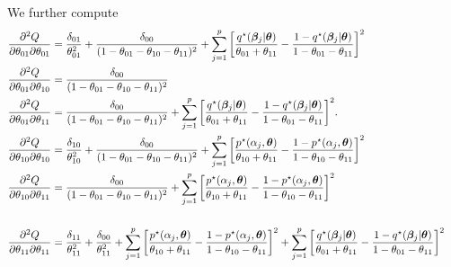 We further compute
\begin{align*}
\frac{\partial^{2} Q}{\partial \theta_{01} \partial \theta_{01}} &= \frac{\delta_{01}}{\theta_{01}^{2}} + \frac{\delta_{00}}{(1 - \theta_{01} - \theta_{10} - \theta_{11})^{2}} + \sum_{j = 1}^{p}{\left[\frac{q^{\star}(\boldsymbol{\beta}_{j}\vert\boldsymbol{\theta})}{\theta_{01} + \theta_{11}} - \frac{1 - q^{\star}(\boldsymbol{\beta}_{j}\vert \boldsymbol{\theta})}{1 - \theta_{01} - \theta_{11}}\right]^{2}} \\
\frac{\partial^{2} Q}{\partial \theta_{01}\partial \theta_{10}} &= \frac{\delta_{00}}{(1 - \theta_{01} - \theta_{10} - \theta_{11})^{2}} \\
\frac{\partial^{2} Q}{\partial \theta_{01}\partial \theta_{11}} &= \frac{\delta_{00}}{(1 - \theta_{01} - \theta_{10} - \theta_{11})^{2}} + \sum_{j = 1}^{p}{\left[\frac{q^{\star}(\boldsymbol{\beta}_{j}\vert\boldsymbol{\theta})}{\theta_{01} + \theta_{11}} - \frac{1 - q^{\star}(\boldsymbol{\beta}_{j}\vert \boldsymbol{\theta})}{1 - \theta_{01} - \theta_{11}}\right]^{2}}.
~ & ~ \\
\frac{\partial^{2} Q}{\partial \theta_{10}\partial\theta_{10}} &= \frac{\delta_{10}}{\theta_{10}^{2}} + \frac{\delta_{00}}{(1 - \theta_{01} - \theta_{10} - \theta_{11})^{2}} +\sum_{j = 1}^{p}{\left[\frac{p^{\star}(\alpha_{j}, \boldsymbol{\theta})}{\theta_{10} + \theta_{11}} - \frac{1 - p^{\star}(\alpha_{j}, \boldsymbol{\theta})}{1 - \theta_{10} - \theta_{11}}\right]^{2}} \\
\frac{\partial^{2} Q}{\partial \theta_{10}\partial\theta_{11}} &= \frac{\delta_{00}}{(1 - \theta_{01} - \theta_{10} - \theta_{11})^{2}} + \sum_{j = 1}^{p}{\left[\frac{p^{\star}(\alpha_{j}, \boldsymbol{\theta})}{\theta_{10} + \theta_{11}} - \frac{1 - p^{\star}(\alpha_{j}, \boldsymbol{\theta})}{1 - \theta_{10} - \theta_{11}}\right]^{2}} \\
~ & ~ \\
\frac{\partial^{2} Q}{\partial \theta_{11}\partial \theta_{11}} &= \frac{\delta_{11}}{\theta_{11}^{2}} + \frac{\delta_{00}}{\theta_{11}^{2}} +  \sum_{j = 1}^{p}{\left[\frac{p^{\star}(\alpha_{j}, \boldsymbol{\theta})}{\theta_{10} + \theta_{11}} - \frac{1 - p^{\star}(\alpha_{j}, \boldsymbol{\theta})}{1 - \theta_{10} - \theta_{11}}\right]^{2}} + \sum_{j = 1}^{p}{\left[\frac{q^{\star}(\boldsymbol{\beta}_{j}\vert\boldsymbol{\theta})}{\theta_{01} + \theta_{11}} - \frac{1 - q^{\star}(\boldsymbol{\beta}_{j}\vert \boldsymbol{\theta})}{1 - \theta_{01} - \theta_{11}}\right]^{2}}
\end{align*}


